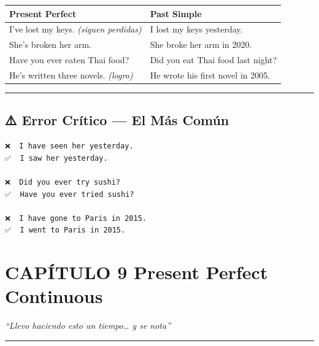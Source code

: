 \documentclass[
  spanish,
  letterpaper,
]{scrbook}
\begin{document}
\begin{longtable}[]{@{}
  >{\raggedright\arraybackslash}p{}
  >{\raggedright\arraybackslash}p{}@{}}
\toprule\noalign{}
\begin{minipage}[b]{\linewidth}\raggedright
Present Perfect
\end{minipage} & \begin{minipage}[b]{\linewidth}\raggedright
Past Simple
\end{minipage} \\
\midrule\noalign{}
\endhead
\bottomrule\noalign{}
\endlastfoot
I've lost my keys. \emph{(siguen perdidas)} & I lost my keys
yesterday. \\
She's broken her arm. & She broke her arm in 2020. \\
Have you ever eaten Thai food? & Did you eat Thai food last night? \\
He's written three novels. \emph{(logro)} & He wrote his first novel in
2005. \\
\end{longtable}

\begin{center}\rule{0.5\linewidth}{0.5pt}\end{center}

\section{⚠️ Error Crítico --- El Más
Común}\label{error-cruxedtico-el-muxe1s-comuxfan}

\begin{verbatim}
❌  I have seen her yesterday.
✅  I saw her yesterday.

❌  Did you ever try sushi?
✅  Have you ever tried sushi?

❌  I have gone to Paris in 2015.
✅  I went to Paris in 2015.
\end{verbatim}

\chapter{CAPÍTULO 9 Present Perfect
Continuous}\label{capuxedtulo-9-present-perfect-continuous}

\emph{``Llevo haciendo esto un tiempo\ldots{} y se nota''}

\begin{center}\rule{0.5\linewidth}{0.5pt}\end{center}
\end{document}
